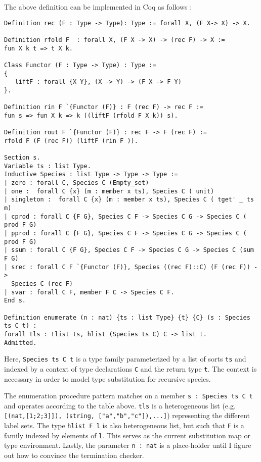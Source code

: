 \documentclass[11pt]{article}
\begin{document}
The above definition can be implemented in Coq as follows \cite{wadler} \cite{chlipala}: 
\begin{verbatim}
Definition rec (F : Type -> Type): Type := forall X, (F X-> X) -> X.

Definition rfold F  : forall X, (F X -> X) -> (rec F) -> X := 
fun X k t => t X k.

Class Functor (F : Type -> Type) : Type := 
{
   liftF : forall {X Y}, (X -> Y) -> (F X -> F Y)
}.

Definition rin F `{Functor (F)} : F (rec F) -> rec F :=
fun s => fun X k => k ((liftF (rfold F X k)) s). 

Definition rout F `{Functor (F)} : rec F -> F (rec F) :=
rfold F (F (rec F)) (liftF (rin F )).

Section s.
Variable ts : list Type.
Inductive Species : list Type -> Type -> Type := 
| zero : forall C, Species C (Empty_set)
| one :  forall C {x} (m : member x ts), Species C ( unit)
| singleton :  forall C {x} (m : member x ts), Species C ( tget' _ ts m)
| cprod : forall C {F G}, Species C F -> Species C G -> Species C ( prod F G)
| pprod : forall C {F G}, Species C F -> Species C G -> Species C ( prod F G)
| ssum : forall C {F G}, Species C F -> Species C G -> Species C (sum F G)
| srec : forall C F `{Functor (F)}, Species ((rec F)::C) (F (rec F)) -> 
  Species C (rec F) 
| svar : forall C F, member F C -> Species C F.
End s.

Definition enumerate (n : nat) {ts : list Type} {t} {C} (s : Species ts C t) : 
forall tls : tlist ts, hlist (Species ts C) C -> list t. 
Admitted.
\end{verbatim}

Here, \texttt{Species ts C t} is a type family parameterized by a list of sorts \texttt{ts} and indexed by 
a context of type declarations \texttt{C} and the return type \texttt{t}. The context is necessary in order 
to model type substitution for recursive species.

The enumeration procedure pattern matches on a member \texttt{s : Species ts C t} and 
operates according to the table above. \texttt{tls} is a heterogeneous list 
(e.g. \texttt{[(nat,[1;2;3]]), (string, ["a","b","c"]),...]}) representing the different label sets. The type
\texttt{hlist F l} is also heterogeneous list, but such that \texttt{F} is a family indexed by elements of 
\texttt{l}. This serves as the current substitution map or type environment.
Lastly, the parameter \texttt{n : nat} is a place-holder until I figure out 
how to convince the termination checker.\\
\end{document}
